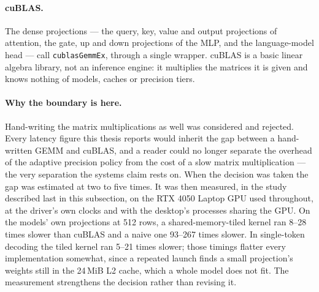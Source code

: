 \documentclass[11pt]{article}
\begin{document}
\paragraph{cuBLAS.} The dense projections --- the query, key, value and output
projections of attention, the gate, up and down projections of the MLP, and the
language-model head --- call \texttt{cublasGemmEx}, through a single wrapper.
cuBLAS is a basic linear algebra library, not an inference engine: it multiplies
the matrices it is given and knows nothing of models, caches or precision tiers.

\paragraph{Why the boundary is here.} Hand-writing the matrix multiplications as
well was considered and rejected. Every latency figure this thesis reports would
inherit the gap between a hand-written GEMM and cuBLAS, and a reader could no
longer separate the overhead of the adaptive precision policy from the cost of a
slow matrix multiplication --- the very separation the systems claim rests on.
When the decision was taken the gap was estimated at two to five times. It was
then measured, in the study described last in this subsection, on the RTX 4050
Laptop GPU used throughout, at the driver's own clocks and with the desktop's
processes sharing the GPU. On the models' own projections at 512 rows, a
shared-memory-tiled kernel ran 8--28 times slower than cuBLAS and a naive one
93--267 times slower. In single-token decoding the tiled kernel ran 5--21 times
slower; those timings flatter every implementation somewhat, since a repeated
launch finds a small projection's weights still in the 24\,MiB L2 cache, which a
whole model does not fit. The measurement strengthens the decision rather than
revising it.
\end{document}
